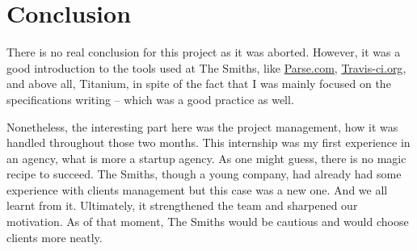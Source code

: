 \section{Conclusion}

There is no real conclusion for this project as it was aborted. However, it was a good introduction to the tools used at The Smiths, like \href{http://www.parse.com/}{Parse.com}, \href{https://travis-ci.org/}{Travis-ci.org}, and above all, Titanium, in spite of the fact that I was mainly focused on the specifications writing -- which was a good practice as well.

\medskip

Nonetheless, the interesting part here was the project management, how it was handled throughout those two months. This internship was my first experience in an agency, what is more a startup agency. As one might guess, there is no magic recipe to succeed. The Smiths, though a young company, had already had some experience with clients management but this case was a new one. And we all learnt from it. Ultimately, it strengthened the team and sharpened our motivation. As of that moment, The Smiths would be cautious and would choose clients more neatly.